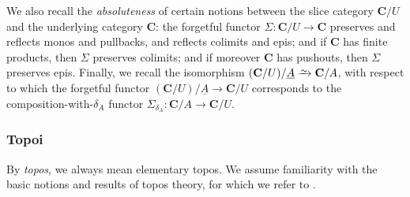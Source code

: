 \documentclass{amsart}
\newcommand\bC{\mathbf{C}}
\newcommand\defeq{\mathrel{\vcenter{\baselineskip0.5ex \lineskiplimit0pt \hbox{.}\hbox{.}}} =}
\newcommand\toi{\xrightarrow{\raisebox{-2.5pt}[0pt][0pt]{\ensuremath{\scriptstyle{\sim}}}}}
\newcommand\tox[2][]{\xrightarrow[#1]{#2}}
\newcommand\und[1]{\underline{#1}}
\newcommand\xot[2][]{\xleftarrow[#1]{#2}}
\theoremstyle{definition}
\theoremstyle{remark}
\theoremstyle{plainwithref}
\begin{document}
We also recall the \emph{absoluteness} of certain notions between the slice category \( \bC / U \) and the underlying category \( \bC \): the forgetful functor \( \Sigma \colon \bC / U \to \bC \) preserves and reflects monos and pullbacks, and reflects colimits and epis; and if \( \bC \) has finite products, then \( \Sigma \) preserves colimits; and if moreover \( \bC \) has pushouts, then \( \Sigma \) preserves epis.
Finally, we recall the isomorphism \( (\bC / U) / \und A \toi \bC / A \), with respect to which the forgetful functor \( (\bC / U) / \und A \to \bC / U \) corresponds to the composition-with-\( \delta_A \) functor \( \Sigma_{\delta_A} \colon \bC / A \to \bC / U \).

\subsubsection{Topoi} \label{subsubsec:topoi-prelims}
By \emph{topos}, we always mean elementary topos.
We assume familiarity with the basic notions and results of topos theory, for which we refer to \cite{johnstone-topos-theory,johnstone-elephant-vols,mac-lane-moerdijk}.
\end{document}
